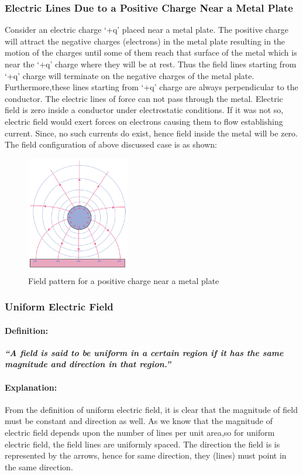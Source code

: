 \subsubsection{Electric Lines Due to a Positive Charge Near a Metal Plate}
Consider an electric charge ‘+q’ placed near a metal plate.
The positive charge will attract the negative charges (electrons) in
the metal plate resulting in the motion of the charges until some
of them reach that surface of the metal which is near the ‘+q’
charge where they will be at rest. Thus the field lines starting from
‘+q’ charge will terminate on the negative charges of the metal plate.
Furthermore,these lines starting from ‘+q’ charge are always perpendicular
to the conductor. The electric lines of force can not pass through the metal.
Electric field is zero inside a conductor under electrostatic conditions.
If it was not so, electric field would exert forces on electrons
causing them to flow establishing current. Since, no such currents do exist,
hence field inside the metal will be zero.
The field configuration of above discussed case is as shown:

\begin{figure}[H]
  \centering
  \includegraphics[width=0.4\textwidth]{Images/11.7.png}
  \caption{Field pattern for a positive charge near a metal plate}
  \label{fig:11.7}
\end{figure}

\subsubsection{Uniform Electric Field}
\paragraph{Definition:}
\textit{\textbf{“A field is said to be uniform in a certain region 
if it has the same magnitude and direction in that region.”}}
\paragraph{Explanation:}
From the definition of uniform electric field, it is clear
that the magnitude of field must be constant and direction as well.
As we know that the magnitude of electric field depends upon the number
of lines per unit area,so for uniform electric field, the field lines
are uniformly spaced. The direction the field is is represented by the
arrows, hence for same direction,
they (lines) must point in the same direction.

